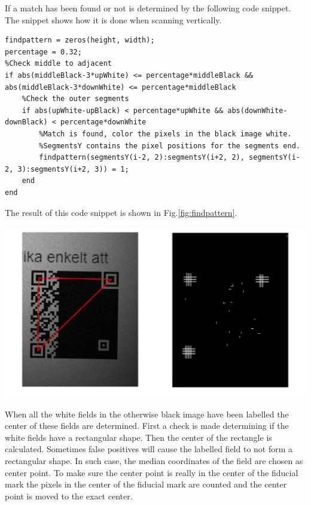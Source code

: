 \documentclass[12pt,a4paper]{article}
\newenvironment{Figure}
  {\par\medskip\noindent\minipage{\linewidth}}
  {\endminipage\par\medskip}
\begin{document}
If a match has been found or not is determined by the following code snippet. The snippet shows how it is done when scanning vertically.
\newpage
\begin{lstlisting}
findpattern = zeros(height, width);
percentage = 0.32;
%Check middle to adjacent
if abs(middleBlack-3*upWhite) <= percentage*middleBlack && abs(middleBlack-3*downWhite) <= percentage*middleBlack
	%Check the outer segments
	if abs(upWhite-upBlack) < percentage*upWhite && abs(downWhite-downBlack) < percentage*downWhite
		%Match is found, color the pixels in the black image white.
		%SegmentsY contains the pixel positions for the segments end.
		findpattern(segmentsY(i-2, 2):segmentsY(i+2, 2), segmentsY(i-2, 3):segmentsY(i+2, 3)) = 1;
	end
end
\end{lstlisting}
The result of this code snippet is shown in Fig.\ref{fig:findpattern}.
\begin{Figure}
  \centering
    \includegraphics[width=1\linewidth]{./img/findpattern.png}
\end{Figure}

When all the white fields in the otherwise black image have been labelled the center of these fields are determined. First a check is made determining if the white fields have a rectangular shape. Then the center of the rectangle is calculated. Sometimes false positives will cause the labelled field to not form a rectangular shape. In such case, the median coordinates of the field are chosen as center point. To make sure the center point is really in the center of the fiducial mark the pixels in the center of the fiducial mark are counted and the center point is moved to the exact center. 
\end{document}
